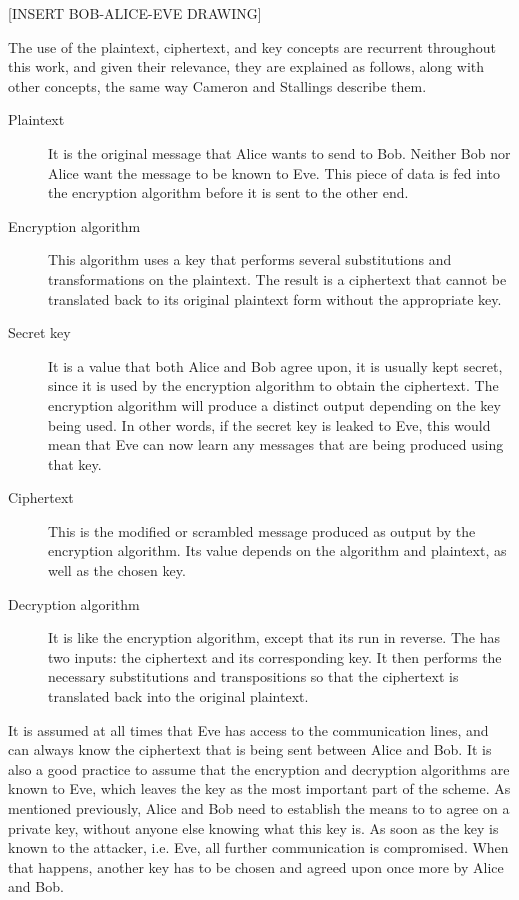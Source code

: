 [INSERT BOB-ALICE-EVE DRAWING]

The use of the plaintext, ciphertext, and key concepts are recurrent throughout this work, and given their relevance, they are explained as follows, along with other concepts, the same way Cameron \cite{CryptoNotes} and Stallings \cite{CryptoStallings} describe them.
\begin{description}
\item[Plaintext] It is the original message that Alice wants to send to Bob. Neither Bob nor Alice want the message to be known to Eve. This piece of data is fed into the encryption algorithm before it is sent to the other end.
\item[Encryption algorithm] This algorithm uses a key that performs several substitutions and transformations on the plaintext. The result is a ciphertext that cannot be translated back to its original plaintext form without the appropriate key.
\item[Secret key] It is a value that both Alice and Bob agree upon, it is usually kept secret, since it is used by the encryption algorithm to obtain the ciphertext. The encryption algorithm will produce a distinct output depending on the key being used. In other words, if the secret key is leaked to Eve, this would mean that Eve can now learn any messages that are being produced using that key.
\item[Ciphertext] This is the modified or scrambled message produced as output by the encryption algorithm. Its value depends on the algorithm and plaintext, as well as the chosen key.
\item[Decryption algorithm] It is like the encryption algorithm, except that its run in reverse. The has two inputs: the ciphertext and its corresponding key. It then performs the necessary substitutions and transpositions so that the ciphertext is translated back into the original plaintext.
\end{description}

It is assumed at all times that Eve has access to the communication lines, and can always know the ciphertext that is being sent between Alice and Bob. It is also a good practice to assume that the encryption and decryption algorithms are known to Eve, which leaves the key as the most important part of the scheme. As mentioned previously, Alice and Bob need to establish the means to to agree on a private key, without anyone else knowing what this key is. As soon as the key is known to the attacker, i.e. Eve, all further communication is compromised. When that happens, another key has to be chosen and agreed upon once more by Alice and Bob.


